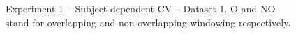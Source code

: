 \documentclass[sensors,article,submit,moreauthors,pdftex]{Definitions/mdpi}
\begin{document}
\begin{figure}[htp]
   \caption{Experiment 1 -- Subject-dependent CV -- Dataset 1. O and NO stand for overlapping and non-overlapping windowing respectively.}
    \label{fig:exp1_ds1}
    
\end{figure}

\begin{figure}[htp]
  \centering
  \quad

\end{figure}
\end{document}
